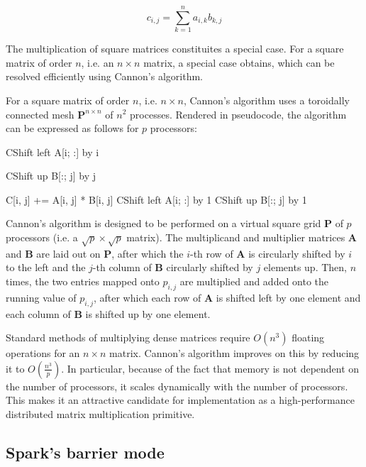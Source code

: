 \documentclass[fleqn,10pt]{SelfArx} %
\begin{document}
$$ c_{i, j} = \sum_{k = 1}^n a_{i, k} b_{k, j} $$

The multiplication of square matrices constituites a special case. For a square matrix of order $n$, i.e. an $n \times n$ matrix, a special case obtains, which can be resolved efficiently using Cannon's algorithm.\cite{cannon1969cellular} 

For a square matrix of order $n$, i.e. $n \times n$, Cannon's algorithm uses a toroidally connected mesh $\mathbf{P}^{n \times n}$ of $n^2$ processes. Rendered in pseudocode, the algorithm can be expressed as follows for $p$ processors:

\begin{algorithmic}
		\State CShift left A[i; :] by i 
	\EndFor
	
		\State CShift up B[:; j] by j 
	\EndFor
	
			\State C[i, j] += A[i, j] * B[i, j]
			\State CShift left A[i; :] by 1
			\State CShift up B[:; j] by 1
		\EndFor
	\EndFor
\end{algorithmic}

Cannon's algorithm is designed to be performed on a virtual square grid $\mathbf{P}$ of $p$ processors (i.e. a $\sqrt{p} \times \sqrt{p}$ matrix). The multiplicand and multiplier matrices $\mathbf{A}$ and $\mathbf{B}$ are laid out on $\mathbf{P}$, after which the $i$-th row of $\mathbf{A}$ is circularly shifted by $i$ to the left and the $j$-th column of $\mathbf{B}$ circularly shifted by $j$ elements up. Then, $n$ times, the two entries mapped onto $p_{i, j}$ are multiplied and added onto the running value of $p_{i, j}$, after which each row of $\mathbf{A}$ is shifted left by one element and each column of $\mathbf{B}$ is shifted up by one element.

Standard methods of multiplying dense matrices require $O(n^3)$ floating operations for an $n \times n$ matrix. Cannon's algorithm improves on this by reducing it to $O(\frac{n^3}{p})$. In particular, because of the fact that memory is not dependent on the number of processors, it scales dynamically with the number of processors. This makes it an attractive candidate for implementation as a high-performance distributed matrix multiplication primitive.


\subsection{Spark's barrier mode} %
\label{sub:spark_s_barrier_mode}
\end{document}
